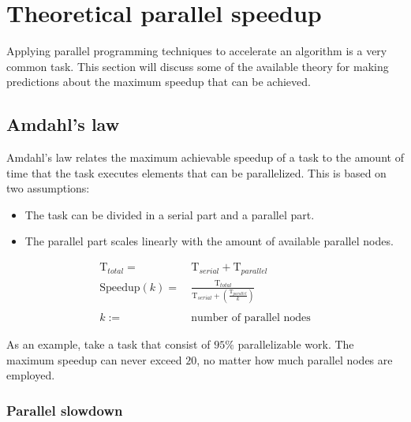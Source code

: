 \chapter{Theoretical parallel speedup}

\hspace{4mm} Applying parallel programming techniques to accelerate an algorithm is a very common task. This section will discuss some of the available theory for making predictions about the maximum speedup that can be achieved.

\section{Amdahl's law}

\hspace{4mm} Amdahl's law relates the maximum achievable speedup of a task to the amount of time that the task executes elements that can be parallelized.\autocite[]{wiki_amdahl} This is based on two assumptions:

\begin{itemize}
    \item The task can be divided in a serial part and a parallel part.
    \item The parallel part scales linearly with the amount of available parallel nodes.
\end{itemize}

\begin{equation} \label{Amd 1 eq.}
    \begin{split}
        \text{T}_{total} = & \ \text{T}_{serial} + \text{T}_{parallel}\\
        \text{Speedup}(k) = & \ \frac{\text{T}_{total}}{\text{T}_{serial} + (\frac{\text{T}_{parallel}}{k})}\\
        \\
        k := & \ \text{number of parallel nodes}
    \end{split}
\end{equation}

\vspace{2mm}

As an example, take a task that consist of $95 \%$ parallelizable work. The maximum speedup can never exceed $20$, no matter how much parallel nodes are employed.

\subsection{Parallel slowdown}

